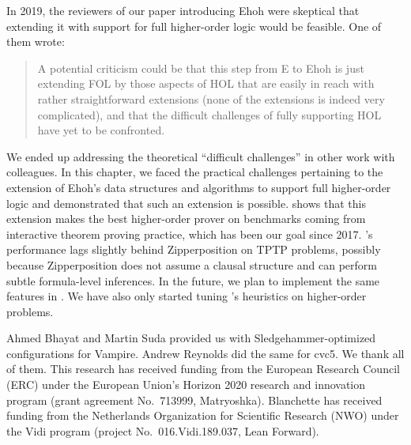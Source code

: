 In 2019, the reviewers of our paper introducing Ehoh \cite{section-ehoh} were
skeptical that extending it with support for full higher-order logic would be
feasible. One of them wrote:
%
\begin{quote}
A potential criticism could be that this step from E to Ehoh is just extending
FOL by those aspects of HOL that are easily in reach with rather straightforward
extensions (none of the extensions is indeed very complicated), and that the
difficult challenges of fully supporting HOL have yet to be confronted.
\end{quote}
%
We ended up addressing the theoretical ``difficult challenges'' in other work
with colleagues. In this chapter, we faced the practical challenges pertaining to the extension
of Ehoh's data structures and algorithms to support full higher-order logic and
demonstrated that such an extension is possible.  shows
that this extension makes \ehohii{} the best higher-order prover on
benchmarks coming from interactive theorem proving practice, which has been our goal since 2017. \ehohii{}'s
performance lags slightly behind Zipperposition on TPTP problems, possibly because Zipperposition
does not assume a clausal structure and can perform subtle formula-level
inferences. In the future, we plan to implement the same features in \ehohii{}.
We have also only started tuning \ehohii{}'s heuristics on higher-order
problems.

\let\Acksize=\footnotesize

\def\ackname{\Acksize Acknowledgment}

\ourpara{\ackname}
{\Acksize
Ahmed Bhayat and Martin Suda provided us
with Sledgehammer-optimized configurations for Vampire. Andrew Reynolds did the
same for cvc5. We thank all of them.
%
This research has received funding from the European Research Council (ERC)
under the European Union's Horizon 2020 research and innovation program (grant
agreement No.\ 713999, Matryoshka).
%
Blanchette has received funding from the Netherlands Organization for
Scientific Research (NWO) under the Vidi program (project No.\
016.Vidi.189.037, Lean Forward).
}






